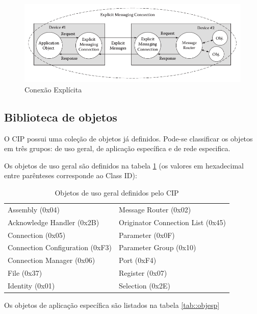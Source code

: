 \begin{figure}[H]
\centering
\includegraphics[width=.9\textwidth]{imagens/CIPmessageEX}
\caption{ Conexão Explícita \cite{cip1}}
\label{im::cipexpcnnx}
\end{figure}

\subsection{Biblioteca de objetos}

O CIP possui uma coleção de objetos já definidos. Pode-se classificar os objetos em três grupos: de uso geral, de aplicação específica e de rede especifica. 

Os objetos de uso geral são definidos na tabela \ref{tab::objusogeral} (os valores em hexadecimal entre parênteses corresponde ao Class ID):

\begin{table}[H]
\begin{center}
\begin{tabular}{ll}
\hline
Assembly (0x04) & Message Router (0x02)\\
Acknowledge Handler (0x2B) & Originator Connection List (0x45)\\
Connection (0x05) & Parameter (0x0F)\\
Connection Configuration (0xF3) & Parameter Group (0x10)\\
Connection Manager (0x06) & Port (0xF4)\\
File (0x37) & Register (0x07)\\
Identity (0x01) & Selection (0x2E)\\\hline
\end{tabular}
\end{center}
\caption{Objetos de uso geral definidos pelo CIP}
\label{tab::objusogeral}
\end{table}

Os objetos de aplicação específica são listados na tabela \ref{tab::objesp}

